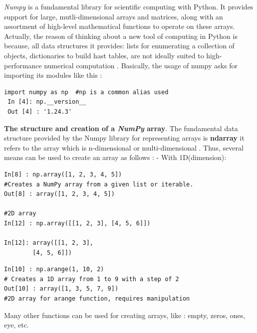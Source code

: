 \documentclass[12pt,a4paper]{report}
\begin{document}
   \textit{Numpy} is a fundamental library for scientific computing with Python. It provides support for large, mutli-dimensional arrays and matrices, along with an assortment of high-level mathematical functions to operate on these arrays.\newline 
 Actually, the reason of thinking about a new tool of computing in Python is because, all  data structures it provides: lists for enumerating a collection of objects, dictionaries to build hast tables, are not ideally suited to high-performance numerical computation \cite{van2011numpy}.\newline 
 Basically, the usage of numpy asks for importing its modules like this :  
 \begin{lstlisting}[style=stylepython]
 import numpy as np  #np is a common alias used  
 In [4]: np.__version__
 Out [4] : '1.24.3'
 \end{lstlisting} 
 \textbf{The structure and creation of a \textit{NumPy} array}. The fundamental data structure provided by the Numpy library for representing arrays is \textbf{ndarray} it refers to the array which is n-dimensional or multi-dimensional \cite{coursAnalyseDonne2}. Thus, several means can be used to create an array as follows  : \newline
 - With 1D(dimension):
 \begin{lstlisting}[style=stylepython]
In[8] : np.array([1, 2, 3, 4, 5])
#Creates a NumPy array from a given list or iterable.
Out[8] : array([1, 2, 3, 4, 5]) 

#2D array
In[12] : np.array([[1, 2, 3], [4, 5, 6]])

In[12]: array([[1, 2, 3],
		[4, 5, 6]])
 \end{lstlisting}
 \begin{lstlisting}[style=stylepython]
In[10] : np.arange(1, 10, 2)  
# Creates a 1D array from 1 to 9 with a step of 2
Out[10] : array([1, 3, 5, 7, 9]) 
#2D array for arange function, requires manipulation
 \end{lstlisting} 
  Many other functions can be used for creating arrays, like : empty, zeros, ones, eye, etc. \\
  
\end{document}
